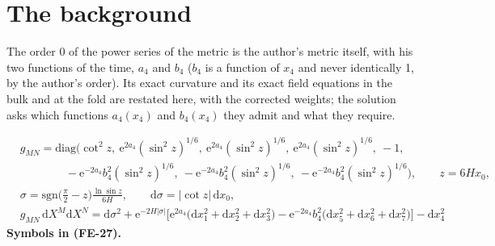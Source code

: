 \documentclass[
  10pt,
]{article}
\begin{document}
\hypertarget{the-background}{%
\section{The background}\label{the-background}}

The order 0 of the power series of the metric is the author's metric
itself, with his two functions of the time, \(a_4\) and \(b_4\) (\(b_4\)
is a function of \(x_4\) and never identically 1, by the author's
order). Its exact curvature and its exact field equations in the bulk
and at the fold are restated here, with the corrected weights; the
solution asks which functions \(a_4(x_4)\) and \(b_4(x_4)\) they admit
and what they require.

\[
\begin{aligned}
&g_{MN} = \mathrm{diag}\Big(\cot^2z,\ \mathrm{e}^{2a_4}(\sin^2z)^{1/6},\ \mathrm{e}^{2a_4}(\sin^2z)^{1/6},
 \ \mathrm{e}^{2a_4}(\sin^2z)^{1/6},\ -1,\\
&\qquad\qquad -\mathrm{e}^{-2a_4}b_4^2(\sin^2z)^{1/6},\ -\mathrm{e}^{-2a_4}b_4^2(\sin^2z)^{1/6},
 \ -\mathrm{e}^{-2a_4}b_4^2(\sin^2z)^{1/6}\Big),\qquad z = 6Hx_0,\\
&\sigma = \mathrm{sgn}\Big(\frac{\pi}{2} - z\Big)\frac{\ln\sin z}{6H},\qquad \mathrm{d}\sigma = \lvert\cot z\rvert\,\mathrm{d}x_0,\\
&g_{MN}\,\mathrm{d}X^M\mathrm{d}X^N = \mathrm{d}\sigma^2 + \mathrm{e}^{-2H\lvert\sigma\rvert}\Big[\mathrm{e}^{2a_4}\big(\mathrm{d}x_1^2
 + \mathrm{d}x_2^2 + \mathrm{d}x_3^2\big) - \mathrm{e}^{-2a_4}b_4^2\big(\mathrm{d}x_5^2 + \mathrm{d}x_6^2 + \mathrm{d}x_7^2\big)\Big]
 - \mathrm{d}x_4^2
\end{aligned} \tag{FE-27}
\] \textbf{Symbols in (FE-27).}
\end{document}
